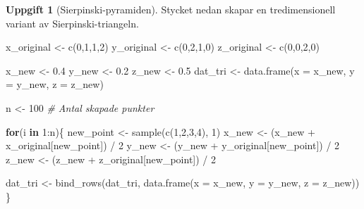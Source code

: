 \documentclass[
]{book}
\newenvironment{Shaded}{\begin{snugshade}}{\end{snugshade}}
\newcommand{\AttributeTok}[1]{\textcolor[rgb]{0.77,0.63,0.00}{#1}}
\newcommand{\CommentTok}[1]{\textcolor[rgb]{0.56,0.35,0.01}{\textit{#1}}}
\newcommand{\ControlFlowTok}[1]{\textcolor[rgb]{0.13,0.29,0.53}{\textbf{#1}}}
\newcommand{\DecValTok}[1]{\textcolor[rgb]{0.00,0.00,0.81}{#1}}
\newcommand{\FloatTok}[1]{\textcolor[rgb]{0.00,0.00,0.81}{#1}}
\newcommand{\FunctionTok}[1]{\textcolor[rgb]{0.00,0.00,0.00}{#1}}
\newcommand{\NormalTok}[1]{#1}
\newcommand{\OtherTok}[1]{\textcolor[rgb]{0.56,0.35,0.01}{#1}}
\newcommand{\SpecialCharTok}[1]{\textcolor[rgb]{0.00,0.00,0.00}{#1}}
\theoremstyle{definition}
\theoremstyle{definition}
\theoremstyle{definition}
\newtheorem{exercise}{Uppgift}[chapter]
\theoremstyle{definition}
\theoremstyle{remark}
\begin{document}
\begin{exercise}[Sierpinski-pyramiden]
Stycket nedan skapar en tredimensionell variant av Sierpinski-triangeln.

\begin{Shaded}
\begin{Highlighting}[]
\NormalTok{x\_original }\OtherTok{\textless{}{-}} \FunctionTok{c}\NormalTok{(}\DecValTok{0}\NormalTok{,}\DecValTok{1}\NormalTok{,}\DecValTok{1}\NormalTok{,}\DecValTok{2}\NormalTok{)}
\NormalTok{y\_original }\OtherTok{\textless{}{-}} \FunctionTok{c}\NormalTok{(}\DecValTok{0}\NormalTok{,}\DecValTok{2}\NormalTok{,}\DecValTok{1}\NormalTok{,}\DecValTok{0}\NormalTok{)}
\NormalTok{z\_original }\OtherTok{\textless{}{-}} \FunctionTok{c}\NormalTok{(}\DecValTok{0}\NormalTok{,}\DecValTok{0}\NormalTok{,}\DecValTok{2}\NormalTok{,}\DecValTok{0}\NormalTok{)}

\NormalTok{x\_new }\OtherTok{\textless{}{-}} \FloatTok{0.4}
\NormalTok{y\_new }\OtherTok{\textless{}{-}} \FloatTok{0.2}
\NormalTok{z\_new }\OtherTok{\textless{}{-}} \FloatTok{0.5}
\NormalTok{dat\_tri }\OtherTok{\textless{}{-}} \FunctionTok{data.frame}\NormalTok{(}\AttributeTok{x =}\NormalTok{ x\_new, }\AttributeTok{y =}\NormalTok{ y\_new, }\AttributeTok{z =}\NormalTok{ z\_new)}

\NormalTok{n }\OtherTok{\textless{}{-}} \DecValTok{100} \CommentTok{\# Antal skapade punkter}

\ControlFlowTok{for}\NormalTok{(i }\ControlFlowTok{in} \DecValTok{1}\SpecialCharTok{:}\NormalTok{n)\{}
\NormalTok{  new\_point }\OtherTok{\textless{}{-}} \FunctionTok{sample}\NormalTok{(}\FunctionTok{c}\NormalTok{(}\DecValTok{1}\NormalTok{,}\DecValTok{2}\NormalTok{,}\DecValTok{3}\NormalTok{,}\DecValTok{4}\NormalTok{), }\DecValTok{1}\NormalTok{)}
\NormalTok{  x\_new }\OtherTok{\textless{}{-}}\NormalTok{ (x\_new }\SpecialCharTok{+}\NormalTok{ x\_original[new\_point]) }\SpecialCharTok{/} \DecValTok{2}
\NormalTok{  y\_new }\OtherTok{\textless{}{-}}\NormalTok{ (y\_new }\SpecialCharTok{+}\NormalTok{ y\_original[new\_point]) }\SpecialCharTok{/} \DecValTok{2}
\NormalTok{  z\_new }\OtherTok{\textless{}{-}}\NormalTok{ (z\_new }\SpecialCharTok{+}\NormalTok{ z\_original[new\_point]) }\SpecialCharTok{/} \DecValTok{2}
  
\NormalTok{  dat\_tri }\OtherTok{\textless{}{-}} \FunctionTok{bind\_rows}\NormalTok{(dat\_tri, }\FunctionTok{data.frame}\NormalTok{(}\AttributeTok{x =}\NormalTok{ x\_new, }\AttributeTok{y =}\NormalTok{ y\_new, }\AttributeTok{z =}\NormalTok{ z\_new))}
\NormalTok{\}}


\end{Highlighting}
\end{Shaded}
\end{exercise}
\end{document}
